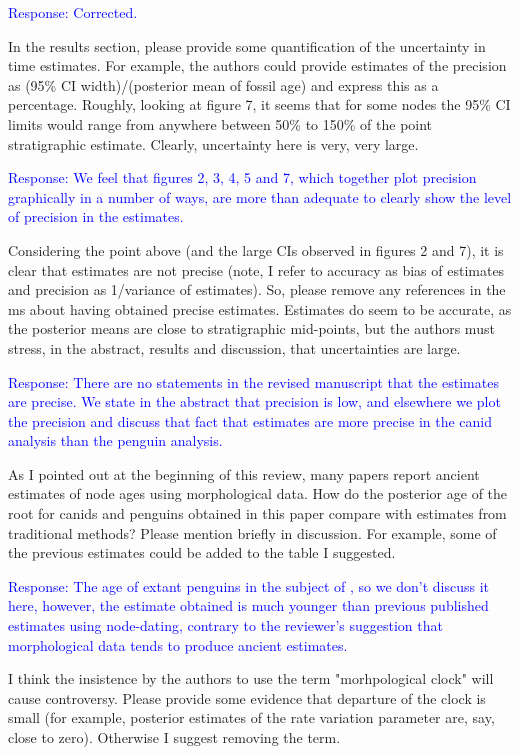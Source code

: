 \documentclass[11pt]{article}
\newcommand{\response}[1]{\medskip{}\textcolor{blue}{{Response: #1}}\medskip{}}
\begin{document}
\response{Corrected.}

In the results section, please provide some quantification of the uncertainty in time estimates. For example,  the authors could provide estimates of the precision as (95\% CI width)/(posterior mean of fossil age) and express this as a percentage. Roughly, looking at figure 7, it seems that for some nodes the 95\% CI limits would range from anywhere between 50\% to 150\% of the point stratigraphic estimate. Clearly, uncertainty here is very, very large. 

\response{We feel that figures 2, 3, 4, 5 and 7, which together plot precision graphically in a number of ways, are more than adequate to clearly show the level of precision in the estimates.}

Considering the point above (and the large CIs observed in figures 2 and 7), it is clear that estimates are not precise (note, I refer to accuracy as bias of estimates and precision as 1/variance of estimates). So, please remove any references in the ms about having obtained precise estimates. Estimates do seem to be accurate, as the posterior means are close to stratigraphic mid-points, but the authors must stress, in the abstract, results and discussion, that uncertainties are large.

\response{There are no statements in the revised manuscript that the estimates are precise. We state in the abstract that precision is low, and elsewhere we plot the precision and discuss that fact that estimates are more precise in the canid analysis than the penguin analysis.}

As I pointed out at the beginning of this review, many papers report ancient estimates of node ages using morphological data. How do the posterior age of the root for canids and penguins obtained in this paper compare with estimates from traditional methods? Please mention briefly in discussion. For example, some of the previous estimates could be added to the table I suggested.

\response{The age of extant penguins in the subject of \cite{gavryushkina2015bayesian}, so we don't discuss it here, however, the estimate obtained is much younger than previous published estimates using node-dating, contrary to the reviewer's suggestion that morphological data tends to produce ancient estimates.}

I think the insistence by the authors to use the term "morhpological clock" will cause controversy. Please provide some evidence that departure of the clock is small (for example, posterior estimates of the rate variation parameter are, say, close to zero). Otherwise I suggest removing the term.
\end{document}
